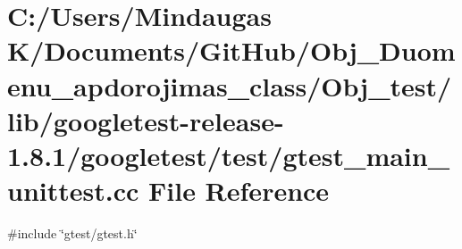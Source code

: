 \hypertarget{_obj__test_2lib_2googletest-release-1_88_81_2googletest_2test_2gtest__main__unittest_8cc}{}\section{C\+:/\+Users/\+Mindaugas K/\+Documents/\+Git\+Hub/\+Obj\+\_\+\+Duomenu\+\_\+apdorojimas\+\_\+class/\+Obj\+\_\+test/lib/googletest-\/release-\/1.8.1/googletest/test/gtest\+\_\+main\+\_\+unittest.cc File Reference}
\label{_obj__test_2lib_2googletest-release-1_88_81_2googletest_2test_2gtest__main__unittest_8cc}
{\ttfamily \#include \char`\"{}gtest/gtest.\+h\char`\"{}}\newline
